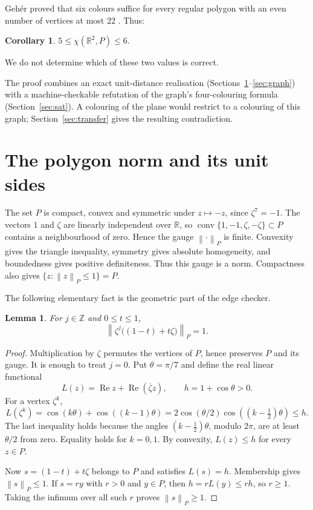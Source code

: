 \documentclass[11pt,a4paper]{article}
\newtheorem{lemma}[theorem]{Lemma}
\newtheorem{corollary}[theorem]{Corollary}
\theoremstyle{remark}
\newcommand{\R}{\mathbb R}
\newcommand{\Z}{\mathbb Z}
\newcommand{\pn}[1]{\left\lVert #1\right\rVert_{P}}
\newcommand{\conv}{\operatorname{conv}}
\begin{document}
Geh\'er proved that six colours suffice for every regular polygon with an
even number of vertices at most $22$ \cite[Theorem~1]{geher}. Thus:
\begin{corollary}\label{cor:bounds}
$5\leq\chi(\R^2,P)\leq6$.
\end{corollary}
We do not determine which of these two values is correct.

The proof combines an exact unit-distance realisation
(Sections~\ref{sec:geometry}--\ref{sec:graph}) with a machine-checkable
refutation of the graph's four-colouring formula (Section~\ref{sec:sat}).
A colouring of the plane would restrict to a colouring of this graph;
Section~\ref{sec:transfer} gives the resulting contradiction.

\section{The polygon norm and its unit sides}\label{sec:geometry}

The set $P$ is compact, convex and symmetric under $z\mapsto-z$, since
$\zeta^7=-1$. The vectors $1$ and $\zeta$ are linearly independent over
$\R$, so $\conv\{1,-1,\zeta,-\zeta\}\subset P$ contains a neighbourhood
of zero. Hence the gauge $\pn{\cdot}$ is finite. Convexity gives the
triangle inequality, symmetry gives absolute homogeneity, and boundedness
gives positive definiteness. Thus this gauge is a norm. Compactness
also gives $\{z:\pn{z}\leq1\}=P$.

The following elementary fact is the geometric part of the edge checker.
\begin{lemma}\label{lem:side}
For $j\in\Z$ and $0\leq t\leq1$,
\[
 \pn{\zeta^j\bigl((1-t)+t\zeta\bigr)}=1.
\]
\end{lemma}
\begin{proof}
Multiplication by $\zeta$ permutes the vertices of $P$, hence preserves
$P$ and its gauge. It is enough to treat $j=0$.
Put $\theta=\pi/7$ and define the real linear functional
\[
 L(z)=\operatorname{Re}z+\operatorname{Re}(\overline\zeta z),\qquad
 h=1+\cos\theta>0.
\]
For a vertex $\zeta^k$,
\[
 L(\zeta^k)=\cos(k\theta)+\cos((k-1)\theta)
 =2\cos(\theta/2)\cos((k-\tfrac12)\theta)\leq h.
\]
The last inequality holds because the angles $(k-\tfrac12)\theta$,
modulo $2\pi$, are at least $\theta/2$ from zero. Equality holds for
$k=0,1$. By convexity, $L(z)\leq h$ for every $z\in P$.

Now $s=(1-t)+t\zeta$ belongs to $P$ and satisfies $L(s)=h$.
Membership gives $\pn{s}\leq1$. If $s=ry$ with $r>0$ and $y\in P$,
then $h=rL(y)\leq rh$, so $r\geq1$. Taking the infimum over all such
$r$ proves $\pn{s}\geq1$.
\end{proof}
\end{document}
